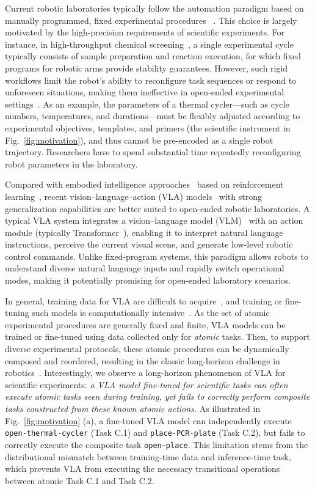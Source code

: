 \documentclass[letterpaper]{article} %
\begin{document}
Current robotic laboratories typically follow the automation paradigm based on manually programmed, fixed experimental procedures
~\cite{coley2020autonomous}.
This choice is largely motivated by the high-precision requirements of scientific experiments.
For instance, in high-throughput chemical screening~\cite{macarron2011impact},
a single experimental cycle typically consists of sample preparation and reaction execution, for which fixed programs for robotic arms provide stability guarantees.
However, such rigid workflows limit the robot’s ability to reconfigure task sequences or respond to unforeseen situations, making them ineffective in open-ended experimental settings~\cite{ochiai2025automating}.
As an example, the parameters of a thermal cycler—such as cycle numbers, temperatures, and durations—must be flexibly adjusted according to experimental objectives, templates, and primers (the scientific instrument in Fig.~\ref{fig:motivation}), and thus cannot be pre-encoded as a single robot trajectory.
Researchers have to spend substantial time repeatedly reconfiguring robot parameters in the laboratory.


Compared with embodied intelligence approaches~\cite{an2025embodied} based on reinforcement learning~\cite{singh2022reinforcement},
recent vision–language–action (VLA) models~\cite{black2024pi_0,kim2025openvla} with strong generalization capabilities are better suited to open-ended robotic laboratories.
A typical VLA system integrates a vision–language model (VLM)~\cite{zhang2024vision,radford2021learning} with an action module (typically Transformer~\cite{vaswani2017attention}), enabling it to interpret natural language instructions, perceive the current visual scene, and generate low-level robotic control commands.
Unlike fixed-program systems, this paradigm allows robots to understand diverse natural language inputs and rapidly switch operational modes, making it potentially promising for open-ended laboratory scenarios.

In general, training data for VLA are difficult to acquire~\cite{mandlekar2023mimicgen}, and training or fine-tuning such models is computationally intensive~\cite{lin2024data}.
As the set of atomic experimental procedures are generally fixed and finite,
VLA models can be trained or fine-tuned using data collected only for \textit{atomic} tasks.
Then, to support diverse experimental protocols, these atomic procedures can be dynamically composed and reordered, resulting in the classic long-horizon challenge in robotics~\cite{fan2025long,gupta2020relay}.
Interestingly, we observe a long-horizon phenomenon of VLA for scientific experiments:
\textit{
a VLA model fine-tuned for scientific tasks can often execute atomic tasks seen during training, yet fails to correctly perform composite tasks constructed from these known atomic actions.}
As illustrated in Fig.~\ref{fig:motivation} (a), a fine-tuned VLA model can independently execute \texttt{open-thermal-cycler} (Task C.1) and \texttt{place-PCR-plate} (Task C.2), but fails to correctly execute the composite task \texttt{open–place}.
This limitation stems from the distributional mismatch between training-time data and inference-time task, which prevents VLA from executing the necessary transitional operations between atomic Task C.1 and Task C.2.
\end{document}

